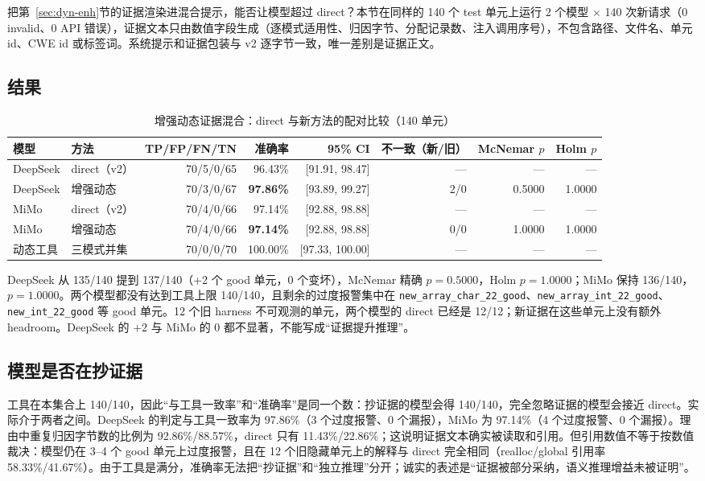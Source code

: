 \documentclass[conference]{IEEEtran}
\begin{document}
把第~\ref{sec:dyn-enh}节的证据渲染进混合提示，能否让模型超过 direct？本节在同样的 140 个 test 单元上运行 2 个模型 $\times$ 140 次新请求（0 invalid、0 API 错误），证据文本只由数值字段生成（逐模式适用性、归因字节、分配记录数、注入调用序号），不包含路径、文件名、单元 id、CWE id 或标签词。系统提示和证据包装与 v2 逐字节一致，唯一差别是证据正文。

\subsection{结果}

\begin{table}[t]
\caption{增强动态证据混合：direct 与新方法的配对比较（140 单元）}
\label{tab:hde}
\centering
\scriptsize
\setlength{\tabcolsep}{3.3pt}
\begin{tabular}{@{}llrrrrrr@{}}
\toprule
模型 & 方法 & TP/FP/FN/TN & 准确率 & 95\% CI & 不一致（新/旧） & McNemar $p$ & Holm $p$\\
\midrule
DeepSeek & direct（v2） & 70/5/0/65 & 96.43\% & [91.91, 98.47] & --- & --- & ---\\
DeepSeek & 增强动态 & 70/3/0/67 & \textbf{97.86\%} & [93.89, 99.27] & 2/0 & 0.5000 & 1.0000\\
MiMo & direct（v2） & 70/4/0/66 & 97.14\% & [92.88, 98.88] & --- & --- & ---\\
MiMo & 增强动态 & 70/4/0/66 & \textbf{97.14\%} & [92.88, 98.88] & 0/0 & 1.0000 & 1.0000\\
动态工具 & 三模式并集 & 70/0/0/70 & 100.00\% & [97.33, 100.00] & --- & --- & ---\\
\bottomrule
\end{tabular}
\end{table}

DeepSeek 从 135/140 提到 137/140（+2 个 good 单元，0 个变坏），McNemar 精确 $p=0.5000$，Holm $p=1.0000$；MiMo 保持 136/140，$p=1.0000$。两个模型都没有达到工具上限 140/140，且剩余的过度报警集中在 \texttt{new\_array\_char\_22\_good}、\texttt{new\_array\_int\_22\_good}、\texttt{new\_int\_22\_good} 等 good 单元。12 个旧 harness 不可观测的单元，两个模型的 direct 已经是 12/12；新证据在这些单元上没有额外 headroom。DeepSeek 的 $+2$ 与 MiMo 的 $0$ 都不显著，不能写成“证据提升推理”。

\subsection{模型是否在抄证据}

工具在本集合上 140/140，因此“与工具一致率”和“准确率”是同一个数：抄证据的模型会得 140/140，完全忽略证据的模型会接近 direct。实际介于两者之间。DeepSeek 的判定与工具一致率为 97.86\%（3 个过度报警、0 个漏报），MiMo 为 97.14\%（4 个过度报警、0 个漏报）。理由中重复归因字节数的比例为 92.86\%/88.57\%，direct 只有 11.43\%/22.86\%；这说明证据文本确实被读取和引用。但引用数值不等于按数值裁决：模型仍在 3--4 个 good 单元上过度报警，且在 12 个旧隐藏单元上的解释与 direct 完全相同（realloc/global 引用率 58.33\%/41.67\%）。由于工具是满分，准确率无法把“抄证据”和“独立推理”分开；诚实的表述是“证据被部分采纳，语义推理增益未被证明”。
\end{document}

